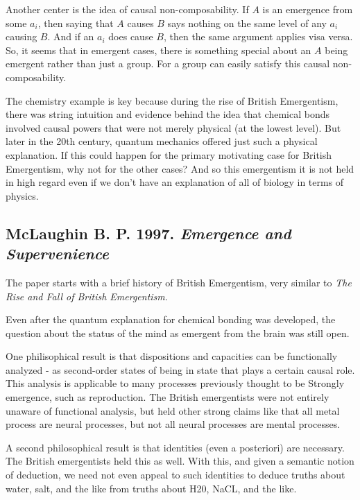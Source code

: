 \documentclass{article}
\newcommand{\ti}[1]{\textit{#1}}
\newcommand{\annbibtitle}[2]{\subsection*{#1. \ti{#2}}}
\begin{document}
Another center is the idea of causal non-composability. If $A$ is an emergence from some $a_i$, then saying that $A$ causes $B$ says nothing on the same level of any $a_i$ causing $B$. And if an $a_i$ does cause $B$, then the same argument applies visa versa. So, it seems that in emergent cases, there is something special about an $A$ being emergent rather than just a group. For a group can easily satisfy this causal non-composability.


The chemistry example is key because during the rise of British Emergentism, there was string intuition and evidence behind the idea that chemical bonds involved causal powers that were not merely physical (at the lowest level). But later in the 20th century, quantum mechanics offered just such a physical explanation. If this could happen for the primary motivating case for British Emergentism, why not for the other cases? And so this emergentism it is not held in high regard even if we don't have an explanation of all of biology in terms of physics.

\annbibtitle{McLaughin B. P. 1997}{Emergence and Supervenience}

The paper starts with a brief history of British Emergentism, very similar to \ti{The Rise and Fall of British Emergentism}.

Even after the quantum explanation for chemical bonding was developed, the question about the status of the mind as emergent from the brain was still open.

One philisophical result is that dispositions and capacities can be functionally analyzed - as second-order states of being in state that plays a certain causal role. This analysis is applicable to many processes previously thought to be Strongly emergence, such as reproduction. The British emergentists were not entirely unaware of functional analysis, but held other strong claims like that all metal process are neural processes, but not all neural processes are mental processes.

A second philosophical result is that identities (even a posteriori) are necessary. The British emergentists held this as well. With this, and given a semantic notion of deduction, we need not even appeal to such identities to deduce truths about water, salt, and the like from truths about H20, NaCL, and the like.
\end{document}
